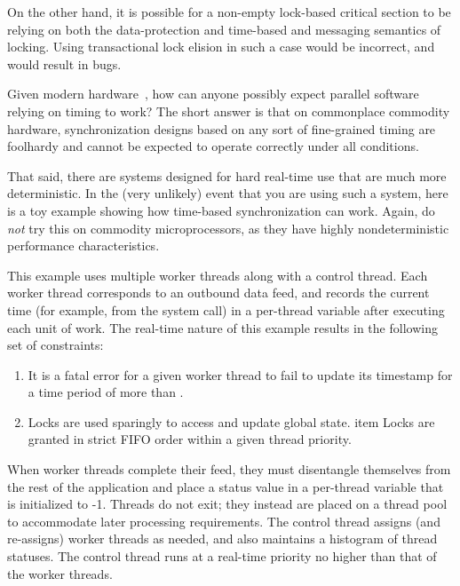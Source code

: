 	On the other hand, it is possible for a non-empty lock-based
	critical section to be relying on both the data-protection
	and time-based and messaging semantics of locking.
	Using transactional lock elision in such a case would be
	incorrect, and would result in bugs.

\QuickQ{}
	Given modern hardware~\cite{PeterOkech2009InherentRandomness},
	how can anyone possibly expect parallel software relying
	on timing to work?
\QuickA{}
	The short answer is that on commonplace commodity hardware,
	synchronization designs based on any sort of fine-grained
	timing are foolhardy and cannot be expected to operate correctly
	under all conditions.

	That said, there are systems designed for hard real-time use
	that are much more deterministic.
	In the (very unlikely) event that you are using such a system,
	here is a toy example showing how time-based synchronization can
	work.
	Again, do \emph{not} try this on commodity microprocessors,
	as they have highly nondeterministic performance characteristics.

	This example uses multiple worker threads along with a control
	thread.
	Each worker thread corresponds to an outbound data feed, and
	records the current time (for example, from the
	 system call) in a per-thread
	 variable after executing each unit
	of work.
	The real-time nature of this example results in the following
	set of constraints:

	\begin{enumerate}
	\item	It is a fatal error for a given worker thread to fail
		to update its timestamp for a time period of more than
		.
	\item	Locks are used sparingly to access and update global
		state.
	item	Locks are granted in strict FIFO order within
		a given thread priority.
	\end{enumerate}

	When worker threads complete their feed, they must disentangle
	themselves from the rest of the application and place a status
	value in a per-thread  variable that is initialized
	to -1.
	Threads do not exit; they instead are placed on a thread pool
	to accommodate later processing requirements.
	The control thread assigns (and re-assigns) worker threads as
	needed, and also maintains a histogram of thread statuses.
	The control thread runs at a real-time priority no higher than
	that of the worker threads.

